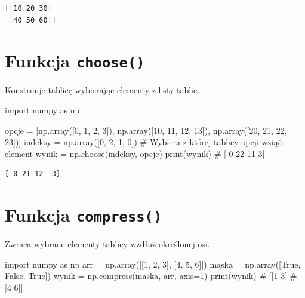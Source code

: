 \documentclass[
  letterpaper,
  DIV=11,
  numbers=noendperiod]{scrreprt}
\newenvironment{Shaded}{\begin{snugshade}}{\end{snugshade}}
\newcommand{\BuiltInTok}[1]{\textcolor[rgb]{0.00,0.23,0.31}{#1}}
\newcommand{\CommentTok}[1]{\textcolor[rgb]{0.37,0.37,0.37}{#1}}
\newcommand{\DecValTok}[1]{\textcolor[rgb]{0.68,0.00,0.00}{#1}}
\newcommand{\ImportTok}[1]{\textcolor[rgb]{0.00,0.46,0.62}{#1}}
\newcommand{\NormalTok}[1]{\textcolor[rgb]{0.00,0.23,0.31}{#1}}
\newcommand{\OperatorTok}[1]{\textcolor[rgb]{0.37,0.37,0.37}{#1}}
\newcommand{\VariableTok}[1]{\textcolor[rgb]{0.07,0.07,0.07}{#1}}
\begin{document}
\begin{verbatim}
[[10 20 30]
 [40 50 60]]
\end{verbatim}

\section{\texorpdfstring{Funkcja
\texttt{choose()}}{Funkcja choose()}}\label{funkcja-choose}

Konstruuje tablicę wybierając elementy z listy tablic.

\begin{Shaded}
\begin{Highlighting}[]
\ImportTok{import}\NormalTok{ numpy }\ImportTok{as}\NormalTok{ np}

\NormalTok{opcje }\OperatorTok{=}\NormalTok{ [np.array([}\DecValTok{0}\NormalTok{, }\DecValTok{1}\NormalTok{, }\DecValTok{2}\NormalTok{, }\DecValTok{3}\NormalTok{]),}
\NormalTok{         np.array([}\DecValTok{10}\NormalTok{, }\DecValTok{11}\NormalTok{, }\DecValTok{12}\NormalTok{, }\DecValTok{13}\NormalTok{]),}
\NormalTok{         np.array([}\DecValTok{20}\NormalTok{, }\DecValTok{21}\NormalTok{, }\DecValTok{22}\NormalTok{, }\DecValTok{23}\NormalTok{])]}
\NormalTok{indeksy }\OperatorTok{=}\NormalTok{ np.array([}\DecValTok{0}\NormalTok{, }\DecValTok{2}\NormalTok{, }\DecValTok{1}\NormalTok{, }\DecValTok{0}\NormalTok{])  }\CommentTok{\# Wybiera z której tablicy opcji wziąć element}
\NormalTok{wynik }\OperatorTok{=}\NormalTok{ np.choose(indeksy, opcje)}
\BuiltInTok{print}\NormalTok{(wynik)  }\CommentTok{\# [ 0 22 11  3]}
\end{Highlighting}
\end{Shaded}

\begin{verbatim}
[ 0 21 12  3]
\end{verbatim}

\section{\texorpdfstring{Funkcja
\texttt{compress()}}{Funkcja compress()}}\label{funkcja-compress}

Zwraca wybrane elementy tablicy wzdłuż określonej osi.

\begin{Shaded}
\begin{Highlighting}[]
\ImportTok{import}\NormalTok{ numpy }\ImportTok{as}\NormalTok{ np}
\NormalTok{arr }\OperatorTok{=}\NormalTok{ np.array([[}\DecValTok{1}\NormalTok{, }\DecValTok{2}\NormalTok{, }\DecValTok{3}\NormalTok{], [}\DecValTok{4}\NormalTok{, }\DecValTok{5}\NormalTok{, }\DecValTok{6}\NormalTok{]])}
\NormalTok{maska }\OperatorTok{=}\NormalTok{ np.array([}\VariableTok{True}\NormalTok{, }\VariableTok{False}\NormalTok{, }\VariableTok{True}\NormalTok{])}
\NormalTok{wynik }\OperatorTok{=}\NormalTok{ np.compress(maska, arr, axis}\OperatorTok{=}\DecValTok{1}\NormalTok{)}
\BuiltInTok{print}\NormalTok{(wynik)}
\CommentTok{\# [[1 3]}
\CommentTok{\#  [4 6]]}
\end{Highlighting}
\end{Shaded}
\end{document}
